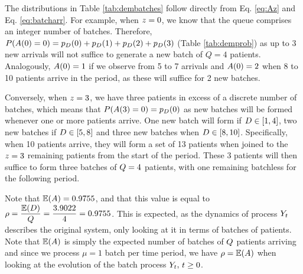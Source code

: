 \begin{ex}
The distributions in Table \ref{tab:dembatches} follow directly from Eq. \eqref{eq:Az} and Eq. \eqref{eq:batcharr}. For example, when $z=0$, we know that the queue comprises an integer number of batches. Therefore, $P(A(0) = 0) = p_{D}(0) + p_{D}(1) + p_{D}(2) + p_{D}(3)$ (Table \ref{tab:demprob}) as up to 3 new arrivals will not suffice to generate a new batch of $Q=4$ patients. Analogously, $A(0)=1$ if we observe from 5 to 7 arrivals and $A(0)=2$ when 8 to 10 patients arrive in the period, as these will suffice for 2 new batches. 

Conversely, when $z=3$, we have three patients in excess of a discrete number of batches, which means that $P(A(3) = 0) = p_{D}(0)$ as new batches will be formed whenever one or more patients arrive. One new batch will form if $D \in [1,4]$, two new batches if $D \in [5,8]$ and three new batches when $D \in [8,10]$. Specifically, when 10 patients arrive, they will form a set of 13 patients when joined to the $z=3$ remaining patients from the start of the period. These 3 patients will then suffice to form three batches of $Q=4$ patients, with one remaining batchless for the following period.

Note that $\mathbb{E}(A) = 0.9755$, and that this value is equal to $\rho = \dfrac{\mathbb{E}(D)}{Q} = \dfrac{3.9022}{4} = 0.9755$. This is expected, as the dynamics of process $Y_{t}$ describes the original system, only looking at it in terms of batches of patients. Note that $\mathbb{E}(A)$ is simply the expected number of batches of $Q$ patients arriving and since we process $\mu=1$ batch per time period, we have $\rho = \mathbb{E}(A)$ when looking at the evolution of the batch process $Y_{t}, \, t \ge 0$.


\end{ex}
